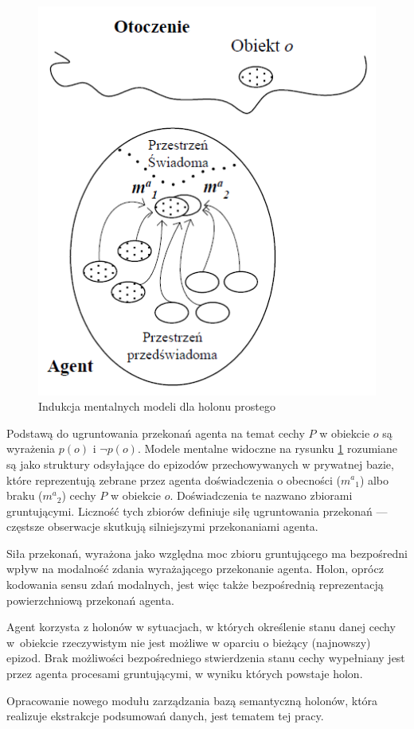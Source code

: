 \begin{figure}  
	\centering\includegraphics[width=.5\textwidth]{img/holon-modele-mentalne}
	\caption{Indukcja mentalnych modeli dla holonu prostego \cite{kat07}}
	\label{rys:holon-ment}
\end{figure}

Podstawą do ugruntowania przekonań agenta na temat cechy $ P $ w obiekcie $ o $ są wyrażenia $ p(o) $ i $ \neg p(o) $. Modele mentalne widoczne na rysunku \ref{rys:holon-ment} rozumiane są jako struktury odsyłające do epizodów przechowywanych w prywatnej bazie, które reprezentują zebrane przez agenta doświadczenia o obecności ($ m^a{}_1 $) albo braku ($ m^a{}_2 $) cechy $ P $ w obiekcie $ o $. Doświadczenia te nazwano zbiorami gruntującymi. Liczność tych zbiorów definiuje siłę ugruntowania przekonań --- częstsze obserwacje skutkują silniejszymi przekonaniami agenta. 

Siła przekonań, wyrażona jako względna moc zbioru gruntującego ma bezpośredni wpływ na modalność zdania wyrażającego przekonanie agenta. Holon, oprócz kodowania sensu zdań modalnych, jest więc także bezpośrednią reprezentacją powierzchniową przekonań agenta.

Agent korzysta z holonów w sytuacjach, w których określenie stanu danej cechy w~obiekcie rzeczywistym nie jest możliwe w oparciu o bieżący (najnowszy) epizod. Brak możliwości bezpośredniego stwierdzenia stanu cechy wypełniany jest przez agenta procesami gruntującymi, w wyniku których powstaje holon.

Opracowanie nowego modułu zarządzania bazą semantyczną holonów, która realizuje ekstrakcje podsumowań danych, jest tematem tej pracy.

